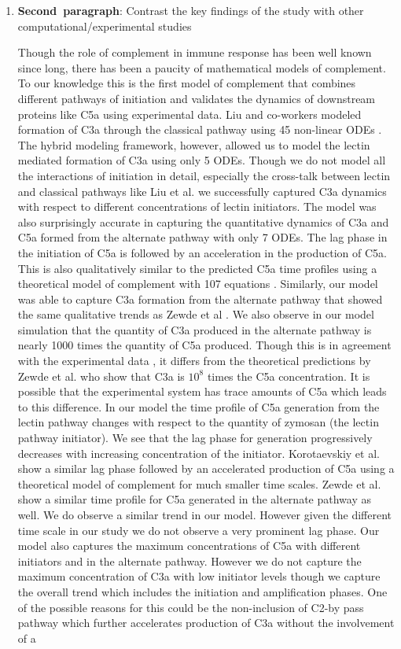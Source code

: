 \documentclass[12pt]{article}
\begin{document}
\begin{enumerate}
	\item{\textbf{Second~paragraph}: Contrast the key findings of the study with other computational/experimental studies}
	
Though the role of complement in immune response has been well known since long, there has been a paucity of mathematical models of complement. To our knowledge this is the first model of complement that combines different pathways of initiation and validates the dynamics of downstream proteins like C5a using experimental data. Liu and co-workers modeled formation of C3a through the classical pathway using 45 non-linear ODEs  \cite{liu2011computational}. The hybrid modeling framework, however, allowed us to model the lectin mediated formation of C3a using only 5 ODEs.  Though we do not model all the interactions of initiation in detail, especially the cross-talk between lectin and classical pathways like Liu et al. \cite{liu2011computational} we successfully captured C3a dynamics with respect to different concentrations of lectin initiators. The model was also surprisingly accurate in capturing the quantitative dynamics of C3a and C5a formed from the alternate pathway with only 7 ODEs. The lag phase in the initiation of C5a is followed by an acceleration in the production of C5a. This is also qualitatively similar to the predicted C5a time profiles using a theoretical model of complement with 107 equations \cite{zewde2016quantitative}. Similarly, our model was able to capture C3a formation from the alternate pathway that showed the same qualitative trends as Zewde et al \cite{zewde2016quantitative}. We also observe in our model simulation that the quantity of C3a produced in the alternate pathway is nearly 1000 times the quantity of  C5a produced. Though this is in agreement with the experimental data  \cite{morad2015time}, it differs from the theoretical predictions by Zewde et al.\cite{zewde2016quantitative} who show that C3a is ${10^8}$ times the C5a concentration. It is possible that the experimental system has trace amounts of C5a which leads to this difference. In our model the time profile of C5a generation from the lectin pathway changes with respect to the quantity of zymosan (the lectin pathway initiator). We see that the lag phase for generation progressively decreases with increasing concentration of the initiator. Korotaevskiy et al. \cite{korotaevskiy2009non} show a similar lag phase followed by an accelerated production of C5a using a theoretical model of complement for much smaller time scales. Zewde et al. \cite{zewde2016quantitative} show a similar time profile for C5a generated in the alternate pathway as well. We do observe a similar trend in our model. However given the different time scale in our study we do not observe a very prominent lag phase. Our model also captures the maximum concentrations of C5a with different initiators and in the alternate pathway. However we do not capture the maximum concentration of C3a with low initiator levels though we capture the overall trend which includes the initiation and amplification phases. One of the possible reasons for this could be the non-inclusion of C2-by pass pathway which further accelerates production of C3a without the involvement of a 
\end{enumerate}
\end{document}
